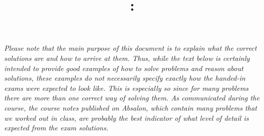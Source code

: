 \documentclass{jn-pset}
\author{\courseinstructor}
\title{\coursenameshort: 
  \examheading}
\begin{document}
\maketitle

{
\noindent
\emph{%
  Please note that the main purpose of this document is to explain
  what the correct solutions are and how to arrive at them.  Thus,
  while the text below is certainly intended to provide good examples
  of how to solve problems and reason about solutions, these examples
  do not necessarily specify exactly how the handed-in exams were
  expected to look like.
%
  This is especially so since for many problems there are more than
  one correct way of solving them.  
%   
%   
  As communicated during the course, the course notes
  published on Absalon, which contain many problems that we worked out
  in class, are probably the best indicator of what level of detail is
  expected from the exam solutions.
}


}
{}

\end{document}
